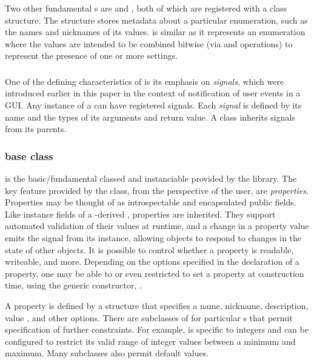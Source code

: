\documentclass[article,shortnames]{jss}
\begin{document}
Two other fundamental s are
 and , both of which are registered with a
class structure. The  structure stores metadata about
a particular enumeration, such as the names and nicknames of its
values.  is similar as it represents an enumeration
where the values are intended to be combined bitwise (via  and 
operations) to represent the presence of one or more settings.

\subsubsection{}

One of the defining characteristics of  is its emphasis
on \emph{signals}, which were introduced earlier in this paper in the
context of notification of user events in a  GUI. Any
instance of a  can have registered signals. Each
\emph{signal} is defined by its name and the types of its arguments
and return value. A class inherits signals from its parents.

\subsubsection[GObject base class]{ base class}

 is the basic/fundamental classed and instanciable
 provided by the  library.  The key feature
provided by the  class, from the perspective of the
 user, are \emph{properties}. Properties may be thought of
as introspectable and encapsulated public fields. Like instance fields
of a -derived ,
properties
are inherited. They support automated validation of their values at
runtime, and a change in a property value emits the 
signal from its instance, allowing objects to respond to changes in
the state of other objects. It is possible to control whether a
property is readable, writeable, and more. Depending on the options
specified in the declaration of a property,
one may be able to or even restricted to set a property at
construction time, using the generic  constructor,
.

A property is defined by a  structure that specifies
a name, nickname, description, value , and other options.
There are subclasses of  for particular s
that permit specification of further constraints. For example,
 is specific to integers and can be
configured to restrict its valid range of integer values between a
minimum and maximum. Many  subclasses also permit
default values.
\end{document}
